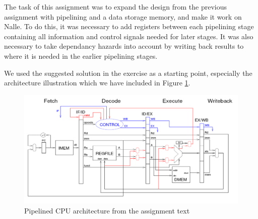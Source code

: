 \documentclass[11pt]{report}
\begin{document}
The task of this assignment was to expand the design from the previous
assignment with pipelining and a data storage memory, and make it work
on Nalle. To do this, it
was necessary to add registers between each pipelining stage containing
all information and control signals needed for later stages. It was also
necessary to take dependancy hazards into account by writing back results
to where it is needed in the earlier pipelining stages. 

We used the suggested solution in the exercise as a starting point, 
especially the architecture illustration which we have included in 
Figure \ref{fig:architecture}.
  
\begin{figure}[htbp]
    \centering
    \includegraphics[width=.95\linewidth]{toplevel.png} 
    \caption{Pipelined CPU architecture from the assignment text}
    \label{fig:architecture}
  \end{figure}



\end{document}
